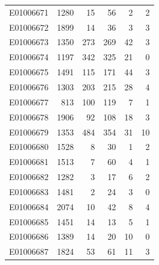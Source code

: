 \documentclass[
  letterpaper,
  DIV=11,
  numbers=noendperiod]{scrreprt}
\begin{document}
\begin{tabular}{lrrrrr}
E01006671     &    1280 &      15 &                    56 &                               2 &                       2 \\
E01006672     &    1899 &      14 &                    36 &                               3 &                       3 \\
E01006673     &    1350 &     273 &                   269 &                              42 &                       3 \\
E01006674     &    1197 &     342 &                   325 &                              21 &                       0 \\
E01006675     &    1491 &     115 &                   171 &                              44 &                       3 \\
E01006676     &    1303 &     203 &                   215 &                              28 &                       4 \\
E01006677     &     813 &     100 &                   119 &                               7 &                       1 \\
E01006678     &    1906 &      92 &                   108 &                              18 &                       3 \\
E01006679     &    1353 &     484 &                   354 &                              31 &                      10 \\
E01006680     &    1528 &       8 &                    30 &                               1 &                       2 \\
E01006681     &    1513 &       7 &                    60 &                               4 &                       1 \\
E01006682     &    1282 &       3 &                    17 &                               6 &                       2 \\
E01006683     &    1481 &       2 &                    24 &                               3 &                       0 \\
E01006684     &    2074 &      10 &                    42 &                               8 &                       4 \\
E01006685     &    1451 &      14 &                    13 &                               5 &                       1 \\
E01006686     &    1389 &      14 &                    20 &                              10 &                       0 \\
E01006687     &    1824 &      53 &                    61 &                              11 &                       3 \\

\end{tabular}
\end{document}
